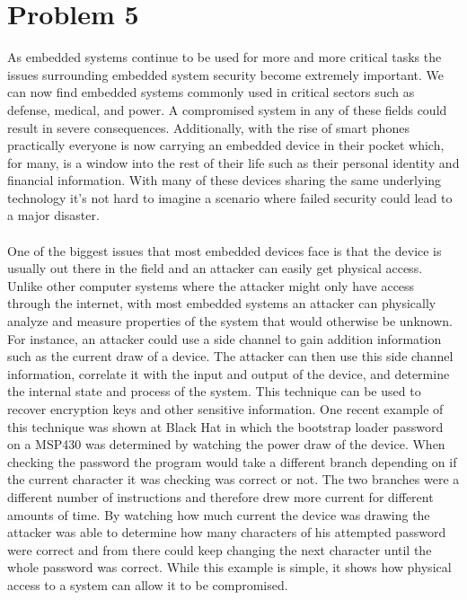 \documentclass{article}
\begin{document}
\section*{Problem 5}
As embedded systems continue to be used for more and more critical tasks the issues surrounding embedded system security become extremely important.
We can now find embedded systems commonly used in critical sectors such as defense, medical, and power. A compromised system in any of these fields
could result in severe consequences. Additionally, with the rise of smart phones practically everyone is now carrying an embedded device in their
pocket which, for many, is a window into the rest of their life such as their personal identity and financial information. With many of these devices
sharing the same underlying technology it's not hard to imagine a scenario where failed security could lead to a major disaster.
\\\\
One of the biggest issues that most embedded devices face is that the device is usually out there in the field and an attacker can easily get physical access.
Unlike other computer systems where the attacker might only have access through the internet, with most embedded systems an attacker can physically
analyze and measure properties of the system that would otherwise be unknown. For instance, an attacker could use a side channel to gain addition information such as
the current draw of a device. The attacker can then use this side channel information, correlate it with the input and output of the device,
and determine the internal state and process of the system. This technique can be used to recover encryption keys and other sensitive information.
One recent example of this technique was shown at Black Hat \cite{bsl} in which the bootstrap loader password on a MSP430 was determined by watching the power
draw of the device. When checking the password the program would take a different branch depending on if the current character it was checking was correct
or not. The two branches were a different number of instructions and therefore drew more current for different amounts of time.
By watching how much current the device was drawing the attacker was able to determine how many characters of his attempted password were correct
and from there could keep changing the next character until the whole password was correct. While this example is simple, it shows how physical access to
a system can allow it to be compromised.
\\\\
\end{document}
